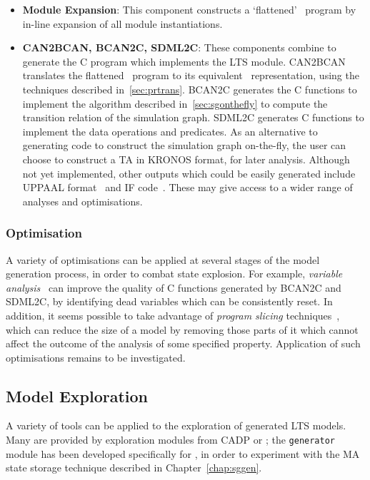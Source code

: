 \begin{itemize}
\item \textbf{Module Expansion}:
This component constructs a `flattened' \candle\ program by in-line
expansion of all module instantiations. 
\item \textbf{CAN2BCAN, BCAN2C, SDML2C}:
These components combine to generate the C program which implements the
LTS module. CAN2BCAN translates the flattened \candle\ program 
to its equivalent \bcandle\ representation, using the techniques
described in~\Sec\ref{sec:prtrans}. BCAN2C generates the C
functions to implement the algorithm described in~\Sec\ref{sec:sgonthefly} to
compute the transition relation of the simulation graph. SDML2C
generates C functions to implement the data operations and predicates.
As an alternative to generating code to construct the simulation graph
on-the-fly, the user can choose to construct a TA in KRONOS  format, 
for later analysis. Although not yet implemented, other outputs which could 
be easily generated include UPPAAL  format~\cite{lpy:97} and 
IF code~\cite{bfg:99}. These may give access to a wider range of
analyses and optimisations.  
\end{itemize}  
\subsubsection{Optimisation}
A variety of optimisations can be applied at several stages of the
model generation process, in order to combat state explosion. For
example, \emph{variable analysis}~\cite{bfg:99b,ss:98} can improve the
quality of C functions generated by BCAN2C and SDML2C, by identifying
dead variables which can be consistently reset. In addition, it seems
possible to take advantage of \emph{program slicing}
techniques~\cite{cdh:00,hdz:00,ls:98}, which can reduce the size of a
model by removing those parts of it which cannot affect the outcome of
the analysis of some specified property. Application of such 
optimisations remains to be investigated.

\subsection{Model Exploration}
A variety of tools can be applied to the exploration of generated LTS
models.  Many are provided by exploration modules from CADP or
\openkronos; the {\tt generator} module has been developed
specifically for \candle, in order to experiment with the MA state
storage technique described in Chapter~\ref{chap:sggen}.

